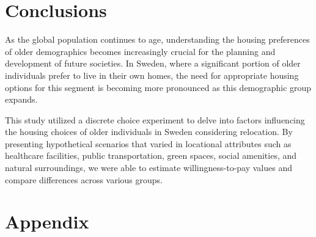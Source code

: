 \documentclass[3p,11pt ]{elsarticle}
\begin{document}
\section{Conclusions}

As the global population continues to age, understanding the housing preferences of older demographics becomes increasingly crucial for the planning and development of future societies.
In Sweden, where a significant portion of older individuals prefer to live in their own homes, the need for appropriate housing options for this segment is becoming more pronounced as this demographic group expands. 

This study utilized a discrete choice experiment to delve into factors influencing the housing choices of older individuals in Sweden considering relocation.
By presenting hypothetical scenarios that varied in locational attributes such as healthcare facilities, public transportation, green spaces, social amenities, and natural surroundings, we were able to estimate willingness-to-pay values and compare differences across various groups.

%



\newpage
\clearpage

\section{Appendix}

%
%
%
%
%
%
%
%
%
\end{document}

